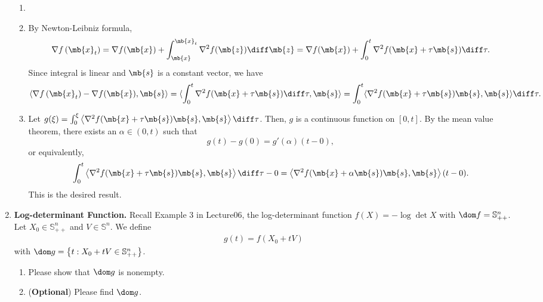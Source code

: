 \begin{exercise}
\begin{enumerate}
      
      \begin{solution}
        \begin{enumerate}
          \item []
          \item By Newton-Leibniz formula,
            $$
              \nabla f\left(\mb{x}_{t}\right)
              = \nabla f(\mb{x}) + \int_{\mb{x}}^{\mb{x}_t}\nabla^{2} f(\mb{z}) \diff \mb{z}
              = \nabla f(\mb{x}) + \int_{0}^{t}\nabla^{2} f(\mb{x}+\tau \mb{s}) \diff \tau.
            $$
            Since integral is linear and $\mb{s}$ is a constant vector, we have
            $$
              \langle\nabla f\left(\mb{x}_{t}\right)-\nabla f(\mb{x}), \mb{s}\rangle
              = \langle\int_{0}^{t}\nabla^{2} f(\mb{x}+\tau \mb{s}) \diff \tau, \mb{s}\rangle
              = \int_{0}^{t}\langle\nabla^{2} f(\mb{x}+\tau \mb{s}) \mb{s}, \mb{s}\rangle \diff \tau.
            $$
          \item Let $g(\xi) = \int_{0}^{\xi}\left\langle\nabla^{2} f(\mb{x}+\tau \mb{s}) \mb{s}, \mb{s}\right\rangle \diff \tau$. Then, $g$ is a continuous function on $[0, t]$. By the mean value theorem, there exists an $\alpha \in (0, t)$ such that
            $$
              g(t) - g(0) = g'(\alpha) (t - 0),
            $$
            or equivalently,
            $$
              \int_{0}^{t}\left\langle\nabla^{2} f(\mb{x}+\tau \mb{s}) \mb{s}, \mb{s}\right\rangle \diff \tau - 0 = \left\langle\nabla^{2} f(\mb{x}+\alpha \mb{s}) \mb{s}, \mb{s}\right\rangle (t - 0).
            $$
            This is the desired result.
            \qedhere
        \end{enumerate}
        \qedhere
      \end{solution}
      
    \item \textbf{Log-determinant Function.}
      Recall Example 3 in Lecture06, the log-determinant function $f(X)=-\log \operatorname{det} X$ with $\dom f=\mathbb{S}_{++}^{n}$.
      Let $X_{0} \in \mathbb{S}_{++}^{n}$ and $V \in \mathbb{S}^{n}$. We define
      \begin{align*}
        g(t)=f\left(X_{0}+t V\right)
      \end{align*}
      with $\dom g=\left\{t: X_{0}+t V \in \mathbb{S}_{++}^{n}\right\}$.
      \begin{enumerate}
        \item Please show that $\dom g$ is nonempty.
        \item (\textbf{Optional}) Please find $\dom g$.
      \end{enumerate}
      

\end{enumerate}
\end{exercise}
